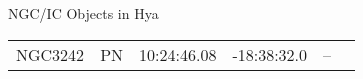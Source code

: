 \begin{block}{NGC/IC Objects in Hya}
  \centering
  \begin{tabularx}{\textwidth}{llrrll} 
    NGC3242 & PN & 10:24:46.08 & -18:38:32.0  & -- \\ 
  \end{tabularx}
\end{block}